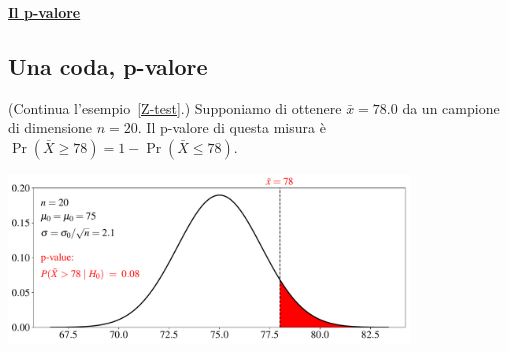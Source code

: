 \documentclass[11pt,openany]{book}
\newcommand{\mylabel}[1]{{\footnotesize\textsf{#1}}\hfill}
\renewenvironment{itemize}
  {\begin{list}{$\triangleright$}{%
   \setlength{\parskip}{0mm}
   \setlength{\topsep}{.2\baselineskip}
   \setlength{\rightmargin}{0mm}
   \setlength{\listparindent}{0mm}
   \setlength{\itemindent}{0mm}
   \setlength{\labelwidth}{3ex}
   \setlength{\itemsep}{.4\baselineskip}
   \setlength{\parsep}{0mm}
   \setlength{\partopsep}{0mm}
   \setlength{\labelsep}{1ex}
   \setlength{\leftmargin}{\labelwidth+\labelsep}
   \let\makelabel\mylabel}}{%
   \end{list}\vspace*{-1.3mm}}
\begin{document}

\clearpage
\hfill\textbf{{\color{brown}\hyperref[pvalore]{Il p-valore \faShare}}}
\subsection{Una coda, p-valore}
(Continua l'esempio~\ref{Z-test}.) Supponiamo di ottenere $\bar x=78.0$ da un campione di dimensione $n=20$. Il p-valore di questa misura è $\Pr(\bar X\ge 78)=1-\Pr(\bar X\le 78)$.

\hfil\includegraphics[width=0.8\textwidth]{figure/Z-test-p-val_01.pdf}
\end{document}

